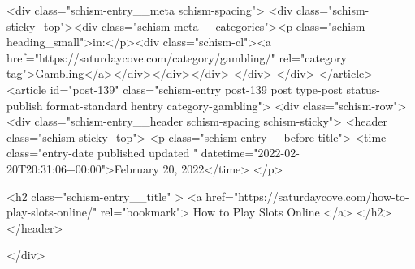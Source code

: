 {		<div class="schism-entry__meta schism-spacing">			<div class="schism-sticky_top"><div class="schism-meta__categories"><p class="schism-heading_small">in:</p><div class="schism-cl"><a href="https://saturdaycove.com/category/gambling/" rel="category tag">Gambling</a></div></div></div>		</div>
	</div>
</article>
<article id="post-139" class="schism-entry post-139 post type-post status-publish format-standard hentry category-gambling">
	<div class="schism-row">		<div class="schism-entry__header schism-spacing schism-sticky">			<header class="schism-sticky_top">				<p class="schism-entry__before-title">
					<time class="entry-date published updated " datetime="2022-02-20T20:31:06+00:00">February 20, 2022</time>				</p>

				<h2 class="schism-entry__title" >
					<a href="https://saturdaycove.com/how-to-play-slots-online/" rel="bookmark">
						How to Play Slots Online					</a>
				</h2>
			</header>

					</div>

}
